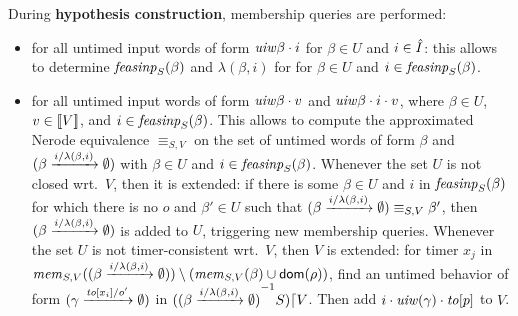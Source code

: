 During {\bf hypothesis construction}, membership queries are performed:
\begin{itemize}
\item for all untimed input words of form $\untimedinputword{\beta} \cdot i$
   for $\beta \in U$ and $i \in \extinputs$: this allows to determine
   $\feasibleinputs{\beta}{S}$ and $\lambda(\beta,i)$ for
   for $\beta \in U$ and $i \in \feasibleinputs{\beta}{S}$.
\item
  for all untimed input words of form $\untimedinputword{\beta} \cdot v$ and
  $\untimedinputword{\beta} \cdot i \cdot v$, where
  $\beta \in U$, $v \in \instancesof{V}$, and
  $i \in \feasibleinputs{\beta}{S}$.
    This allows to compute the approximated Nerode equivalence $\equiv_{S,V}$ on
    the set of untimed words of form $\beta$ and
    $\extend{\beta}{i}{\lambda(\beta,i)}$ with
    $\beta \in U$ and $i \in \feasibleinputs{\beta}{S}$.
    Whenever the set $U$ is not closed wrt.\ $V$, then it is extended:
if there is some $\beta \in U$ and $i$ in $\feasibleinputs{\beta}{S}$
for which there is no $o$ and $\beta' \in U$ such that
$\extend{\beta}{i}{\lambda(\beta,i)} \equiv_{S,V} \beta'$, 
then $\extend{\beta}{i}{\lambda(\beta,i)}$ is added to $U$,
triggering new membership queries.
Whenever the set $U$ is not timer-consistent wrt.\ $V$, then $V$ is extended:
for timer $x_j$ in
$\getmemorable{S}{\extend{\beta}{i}{\lambda(\beta,i)}}{V} \setminus (\getmemorable{S}{\beta}{V} \cup \domof{\rho})$, find an 
untimed behavior of form $\extend{\gamma}{\toevent{x_i}}{o'}$ in
$\suffixbehs{S}{\extend{\beta}{i}{\lambda(\beta,i)}}{V}$.
Then add $i\cdot\untimedinputword(\gamma)\cdot\toevent{p}$ to $V$.
\end{itemize}

